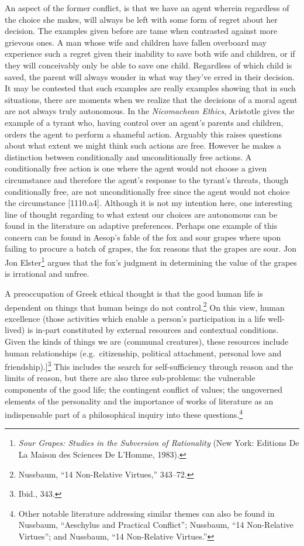 \documentclass[
  12pt,
]{book}
\theoremstyle{definition}
\theoremstyle{definition}
\theoremstyle{definition}
\theoremstyle{definition}
\theoremstyle{remark}
\begin{document}
An aspect of the former conflict, is that we have an agent wherein regardless of the choice she makes, will always be left with some form of regret about her decision. The examples given before are tame when contrasted against more grievous ones. A man whose wife and children have fallen overboard may experience such a regret given their inability to save both wife and children, or if they will conceivably only be able to save one child. Regardless of which child is saved, the parent will always wonder in what way they've erred in their decision. It may be contested that such examples are really examples showing that in such situations, there are moments when we realize that the decisions of a moral agent are not always truly autonomous. In the \emph{Nicomachean Ethics}, Aristotle gives the example of a tyrant who, having control over an agent's parents and children, orders the agent to perform a shameful action. Arguably this raises questions about what extent we might think such actions are free. However he makes a distinction between conditionally and unconditionally free actions. A conditionally free action is one where the agent would not choose a given circumstance and therefore the agent's response to the tyrant's threats, though conditionally free, are not unconditionally free since the agent would not choice the circumstance {[}1110.a4{]}. Although it is not my intention here, one interesting line of thought regarding to what extent our choices are autonomous can be found in the literature on adaptive preferences. Perhaps one example of this concern can be found in Aesop's fable of the fox and sour grapes where upon failing to procure a batch of grapes, the fox reasons that the grapes are sour. Jon Jon Elster\footnote{\emph{Sour {Grapes}: {Studies} in the {Subversion} of {Rationality}} (New York: Editions De La Maison des Sciences De L'Homme, 1983).} argues that the fox's judgment in determining the value of the grapes is irrational and unfree.

A preoccupation of Greek ethical thought is that the good human life is dependent on things that human beings do not control.\footnote{Nussbaum, {``14 {Non-Relative Virtues},''} 343--72.} On this view, human excellence (those activities which enable a person's participation in a life well-lived) is in-part constituted by external resources and contextual conditions. Given the kinds of things we are (communal creatures), these resources include human relationships (e.g.~citizenship, political attachment, personal love and friendship).{]}\footnote{Ibid., 343.} This includes the search for self-sufficiency through reason and the limits of reason, but there are also three sub-problems: the vulnerable components of the good life; the contingent conflict of values; the ungoverned elements of the personality and the importance of works of literature as an indispensable part of a philosophical inquiry into these questions.\footnote{Other notable literature addressing similar themes can also be found in Nussbaum, {``Aeschylus and Practical Conflict''}; Nussbaum, {``14 {Non-Relative Virtues}''}; and Nussbaum, {``14 {Non-Relative Virtues}.''}}
\end{document}
